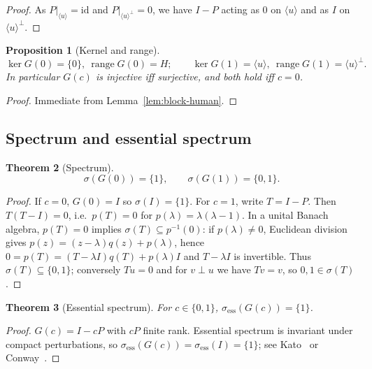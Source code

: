 \documentclass[11pt]{article}
\newtheorem{theorem}{Theorem}[section]
\newtheorem{proposition}[theorem]{Proposition}
\theoremstyle{definition}
\DeclareMathOperator{\range}{range}
\DeclareMathOperator{\kerop}{ker}
\begin{document}
\begin{proof}
As $P|_{\langle u\rangle}=\mathrm{id}$ and $P|_{\langle u\rangle^\perp}=0$, we have $I-P$ acting as $0$ on $\langle u\rangle$ and as $I$ on $\langle u\rangle^\perp$.
\end{proof}

\begin{proposition}[Kernel and range]\label{prop:ker-range-human}
\[
\kerop G(0)=\{0\},\ \range G(0)=H;\qquad
\kerop G(1)=\langle u\rangle,\ \range G(1)=\langle u\rangle^\perp.
\]
In particular $G(c)$ is injective iff surjective, and both hold iff $c=0$.
\end{proposition}

\begin{proof}
Immediate from Lemma~\ref{lem:block-human}.
\end{proof}

\subsection{Spectrum and essential spectrum}

\begin{theorem}[Spectrum]\label{thm:spectrum-human}
\[
\sigma(G(0))=\{1\},\qquad \sigma(G(1))=\{0,1\}.
\]
\end{theorem}

\begin{proof}
If $c=0$, $G(0)=I$ so $\sigma(I)=\{1\}$. For $c=1$, write $T=I-P$. Then
$T(T-I)=0$, i.e.\ $p(T)=0$ for $p(\lambda)=\lambda(\lambda-1)$. In a unital Banach algebra, $p(T)=0$ implies $\sigma(T)\subseteq p^{-1}(0)$: if $p(\lambda)\ne 0$, Euclidean division gives $p(z)=(z-\lambda)q(z)+p(\lambda)$, hence $0=p(T)=(T-\lambda I)q(T)+p(\lambda)I$ and $T-\lambda I$ is invertible. Thus $\sigma(T)\subseteq\{0,1\}$; conversely $Tu=0$ and for $v\perp u$ we have $Tv=v$, so $0,1\in\sigma(T)$.
\end{proof}

\begin{theorem}[Essential spectrum]\label{thm:ess-human}
For $c\in\{0,1\}$, $\sigma_{\mathrm{ess}}(G(c))=\{1\}$.
\end{theorem}

\begin{proof}
$G(c)=I-cP$ with $cP$ finite rank. Essential spectrum is invariant under compact perturbations, so $\sigma_{\mathrm{ess}}(G(c))=\sigma_{\mathrm{ess}}(I)=\{1\}$; see Kato~\cite{Kato} or Conway~\cite{Conway}.
\end{proof}
\end{document}
